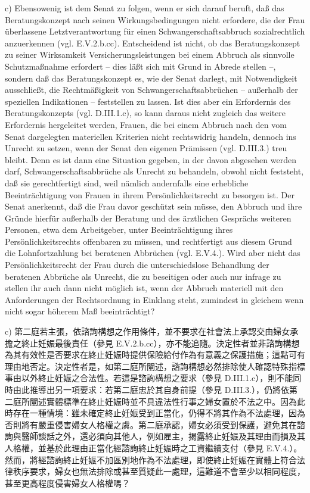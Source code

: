 \documentclass[12pt]{article}
\begin{document}
\begin{sourcepara}[title={原文SondervotumB.326}]
c) Ebensowenig ist dem Senat zu folgen, wenn er sich darauf beruft, daß das Beratungskonzept nach seinen Wirkungsbedingungen nicht erfordere, die der Frau überlassene Letztverantwortung für einen Schwangerschaftsabbruch sozialrechtlich anzuerkennen (vgl. E.V.2.b.cc). Entscheidend ist nicht, ob das Beratungskonzept zu seiner Wirksamkeit Versicherungsleistungen bei einem Abbruch als sinnvolle Schutzmaßnahme erfordert -- dies läßt sich mit Grund in Abrede stellen --, sondern daß das Beratungskonzept es, wie der Senat darlegt, mit Notwendigkeit ausschließt, die Rechtmäßigkeit von Schwangerschaftsabbrüchen -- außerhalb der speziellen Indikationen -- feststellen zu lassen. Ist dies aber ein Erfordernis des Beratungskonzepts (vgl. D.III.1.c), so kann daraus nicht zugleich das weitere Erfordernis hergeleitet werden, Frauen, die bei einem Abbruch nach den vom Senat dargelegten materiellen Kriterien nicht rechtswidrig handeln, dennoch ins Unrecht zu setzen, wenn der Senat den eigenen Prämissen (vgl. D.III.3.) treu bleibt. Denn es ist dann eine Situation gegeben, in der davon abgesehen werden darf, Schwangerschaftsabbrüche als Unrecht zu behandeln, obwohl nicht feststeht, daß sie gerechtfertigt sind, weil nämlich andernfalls eine erhebliche Beeinträchtigung von Frauen in ihrem Persönlichkeitsrecht zu besorgen ist. Der Senat anerkennt, daß die Frau davor geschützt sein müsse, den Abbruch und ihre Gründe hierfür außerhalb der Beratung und des ärztlichen Gesprächs weiteren Personen, etwa dem Arbeitgeber, unter Beeinträchtigung ihres Persönlichkeitsrechts offenbaren zu müssen, und rechtfertigt aus diesem Grund die Lohnfortzahlung bei beratenen Abbrüchen (vgl. E.V.4.). Wird aber nicht das Persönlichkeitsrecht der Frau durch die unterschiedslose Behandlung der beratenen Abbrüche als Unrecht, die zu beseitigen oder auch nur infrage zu stellen ihr auch dann nicht möglich ist, wenn der Abbruch materiell mit den Anforderungen der Rechtsordnung in Einklang steht, zumindest in gleichem wenn nicht sogar höherem Maß beeinträchtigt?
\end{sourcepara}
\begin{transpara}
c) 第二庭若主張，依諮詢構想之作用條件，並不要求在社會法上承認交由婦女承擔之終止妊娠最後責任（參見 E.V.2.b.cc），亦不能追隨。決定性者並非諮詢構想為其有效性是否要求在終止妊娠時提供保險給付作為有意義之保護措施；這點可有理由地否定。決定性者是，如第二庭所闡述，諮詢構想必然排除使人確認特殊指標事由以外終止妊娠之合法性。若這是諮詢構想之要求（參見 D.III.1.c），則不能同時由此推導出另一項要求：若第二庭忠於其自身前提（參見 D.III.3.），仍將依第二庭所闡述實體標準在終止妊娠時並不具違法性行事之婦女置於不法之中。因為此時存在一種情境：雖未確定終止妊娠受到正當化，仍得不將其作為不法處理，因為否則將有嚴重侵害婦女人格權之虞。第二庭承認，婦女必須受到保護，避免其在諮詢與醫師談話之外，還必須向其他人，例如雇主，揭露終止妊娠及其理由而損及其人格權，並基於此理由正當化經諮詢終止妊娠時之工資繼續支付（參見 E.V.4.）。然而，將經諮詢終止妊娠不加區別地作為不法處理，即使終止妊娠在實體上符合法律秩序要求，婦女也無法排除或甚至質疑此一處理，這難道不會至少以相同程度，甚至更高程度侵害婦女人格權嗎？
\end{transpara}
\end{document}
